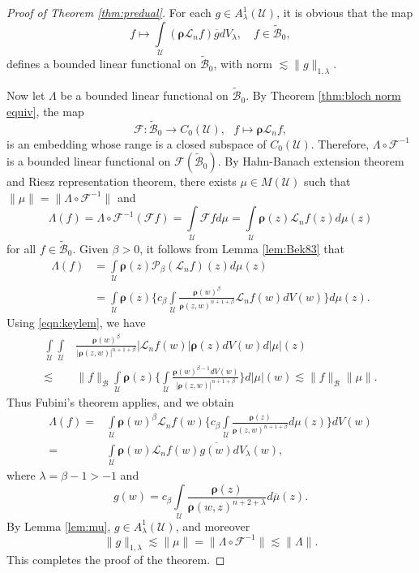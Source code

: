 \documentclass{amsart}
\numberwithin{equation}{section}
\newcommand{\bfL}{\mathcal{L}}
\newcommand{\calU}{\mathcal{U}}
\newcommand{\bfrho}{\boldsymbol{\rho}}
\newcommand{\calB}{\mathcal{B}}
\begin{document}
\begin{proof}[Proof of Theorem \ref{thm:predual}]
For each $g\in A_\lambda^1(\calU)$, it is obvious that the map
\[
f \longmapsto  \int\limits_{\calU} (\bfrho \bfL_n f )\overline{g} dV_\lambda,\quad f\in\widetilde{\calB}_0,
\]
defines a bounded linear functional on $\widetilde{\calB}_0$,  with norm $\lesssim\|g\|_{1,\lambda}$.

Now let $\Lambda$ be a bounded linear functional on $\widetilde{\calB}_0$.  
By Theorem \ref{thm:bloch norm equiv}, the map
\begin{equation*}\label{eq:map_L}
\mathcal{F}:\widetilde{\calB}_0 \to C_0(\calU),\ \ \ f \mapsto  \bfrho \bfL_n f,
\end{equation*}
is an embedding whose range is a closed subspace of $C_0(\calU)$.
Therefore, $\Lambda\circ \mathcal{F}^{-1}$
is a bounded linear functional on $\mathcal{F}(\widetilde{\calB}_0)$.
By Hahn-Banach extension theorem and Riesz representation theorem, there exists $\mu\in M(\calU)$ such that
$ \|\mu\|=\|\Lambda\circ \mathcal{F}^{-1}\|$ and
\[
\Lambda (f) = \Lambda\circ \mathcal{F}^{-1} (\mathcal{F} f) = \int\limits_{\calU} \mathcal{F} f d\mu
= \int\limits_{\calU} \bfrho(z) \bfL_n f(z) d\mu(z)
\]
for all $f\in \widetilde{\calB}_0$. Given $\beta>0$, it follows from Lemma \ref{lem:Bek83} that
\begin{align*}
\Lambda (f)&= \int\limits_{\calU} \bfrho(z) \mathcal{P}_\beta(\bfL_nf)(z) d\mu(z)\\
&= \int\limits_{\calU} \bfrho(z) \bigg\{ c_\beta
\int\limits_{\calU} \frac{\bfrho(w)^\beta}{\bfrho(z,w)^{n+1+\beta}} \bfL_n f(w) dV(w) \bigg\} d\mu(z).
\end{align*}
Using \eqref{eqn:keylem}, we have
\begin{align*}
\int\limits_{\calU} \int\limits_{\calU} & \frac {\bfrho(w)^\beta}{|\bfrho(z,w)|^{n+1+\beta}} |\bfL_n f(w)| \bfrho(z) dV(w) d|\mu|(z)\\
\lesssim &  \|f\|_{\calB} \int\limits_{\calU} \bfrho(z) \bigg\{\int\limits_{\calU}  \frac {\bfrho(w)^{\beta-1} dV(w)} {|\bfrho(z,w)|^{n+1+\beta}}
\bigg\} d|\mu|(w) 
\lesssim  \|f\|_{\calB} \|\mu\|.
\end{align*}
Thus Fubini's theorem applies, and we obtain
\begin{align*}
\Lambda(f) =&  \int\limits_{\calU} \bfrho(w)^\beta \bfL_n f(w) \bigg\{ c_\beta \int\limits_{\calU} \frac {\bfrho(z)}{\bfrho(z,w)^{n+1+\beta}} d\mu(z)\bigg\}  dV(w)\\
=&  \int\limits_{\calU} \bfrho(w) \bfL_n f(w) \overline{g(w)} dV_{\lambda}(w),
\end{align*}
where $\lambda=\beta-1>-1$ and 
\[
g(w) = c_\beta \int\limits_{\calU} \frac {\bfrho(z)}{\bfrho(w,z)^{n+2+\lambda}} d\overline{\mu}(z).
\]
By Lemma \ref{lem:mu}, $g\in A_\lambda^1(\calU)$, and moreover
\[
\|g\|_{1,\lambda}\lesssim \|\mu\|=\|\Lambda\circ \mathcal{F}^{-1}\| \lesssim \|\Lambda\|.
\]
This completes the proof of the theorem.
\end{proof}
\end{document}
